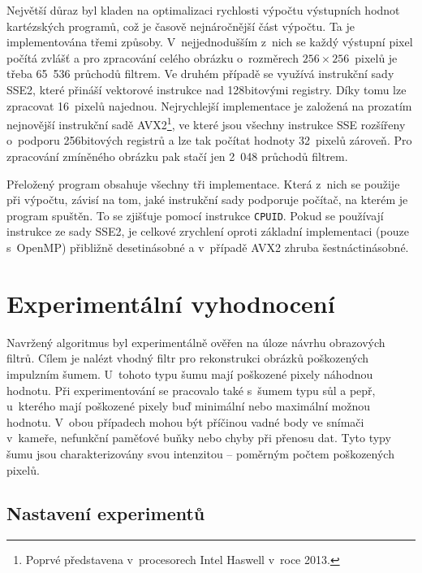 \documentclass[czech]{ExcelAtFIT} %
\begin{document}
Největší důraz byl kladen na optimalizaci rychlosti výpočtu výstupních hodnot kartézských programů, což je časově nejnáročnější část výpočtu. Ta je implementována třemi způsoby. V~nejjednodušším z~nich se každý výstupní pixel počítá zvlášť a pro zpra\-co\-vání celého obrázku o~rozměrech $256\times256$~pixelů je třeba 65~536 průchodů filtrem. Ve druhém případě se využívá instrukční sady SSE2, které přináší vek\-to\-rové instrukce nad 128bitovými registry. Díky tomu lze zpracovat 16~pixelů najednou. Nejrychlejší im\-ple\-men\-tace je založená na prozatím nejnovější instrukční sadě AVX2\footnote{Poprvé představena v~procesorech Intel Haswell v~roce 2013.}, ve které jsou všechny instrukce SSE rozšířeny o~podporu 256bitových registrů a lze tak počítat hodnoty 32~pixelů zároveň. Pro zpracování zmíněného obrázku pak stačí jen 2~048 průchodů filtrem.

Přeložený program obsahuje všechny tři implementace. Která z~nich se použije při výpočtu, závisí na tom, jaké instrukční sady podporuje počítač, na kterém je program spuštěn. To se zjišťuje pomocí instrukce \texttt{CPUID}. Pokud se používají instrukce ze sady SSE2, je celkové zrychlení oproti základní implementaci (pouze s~OpenMP) při\-bližně dese\-ti\-ná\-sobné a v~případě AVX2 zhruba šest\-nác\-ti\-ná\-sobné.

\section{Experimentální vyhodnocení}
\label{sec:Experimental}

Navržený algoritmus byl experimentálně ověřen na úloze návrhu obrazových filtrů. Cílem je nalézt vhodný filtr pro rekonstrukci obrázků poškozených impulzním šumem. U~tohoto typu šumu mají poškozené pixely náhodnou hodnotu. Při experimentování se pra\-co\-valo také s~šumem typu sůl a pepř, u~kterého mají poškozené pixely buď minimální nebo maximální možnou hodnotu. V~obou případech mohou být příčinou vadné body ve snímači v~kameře, nefunkční paměťové buňky nebo chyby při přenosu dat. Tyto typy šumu jsou charakterizovány svou in\-ten\-zi\-tou -- poměrným poč\-tem poškozených pixelů.

\subsection{Nastavení experimentů}
\end{document}
